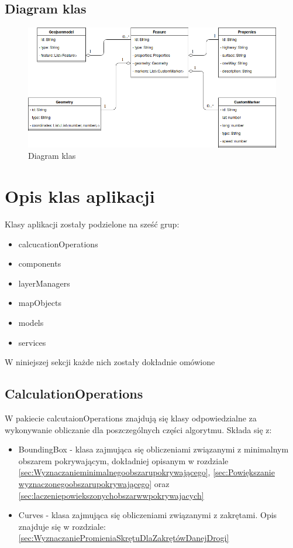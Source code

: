 \newpage
\subsection{Diagram klas}

\begin{figure}[h]
\caption{Diagram klas}
\label{sec:inOutBorder}
\centering
\includegraphics[width=1.05\textwidth]{diagramKlas}
\end{figure}

\section{Opis klas aplikacji}

Klasy aplikacji zostały podzielone na sześć grup:
\begin{itemize}
\item calcucationOperations
\item components
\item layerManagers
\item mapObjects
\item models
\item services
\end{itemize}
W niniejszej sekcji każde nich zostały dokładnie omówione

\newpage
\subsection{CalculationOperations}
W pakiecie calcutaionOperations znajdują się klasy odpowiedzialne za wykonywanie obliczanie dla poszczególnych części algorytmu. Składa się z:
\begin{itemize}
\item BoundingBox - klasa zajmująca się obliczeniami związanymi z minimalnym obszarem pokrywającym, dokładniej opisanym w rozdziale \ref{sec:Wyznaczanieminimalnegoobszarupokrywającego}, \ref{sec:Powiększanie wyznaczonegoobszarupokrywającego} oraz \ref{sec:laczeniepowiekszonychobszarwwpokrywajacych}
\item Curves - klasa zajmująca się obliczeniami związanymi z zakrętami. Opis znajduje się w rozdziale: \ref{sec:WyznaczaniePromieniaSkrętuDlaZakrętówDanejDrogi}
\end{itemize} 

